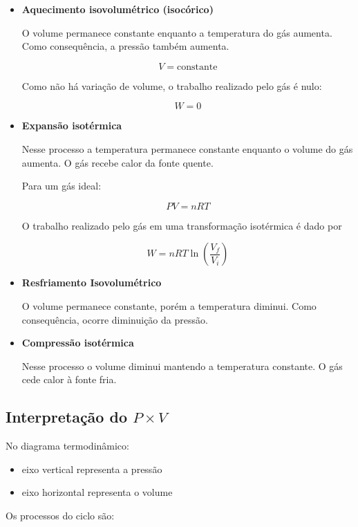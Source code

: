 \documentclass[a4paper,12pt]{article}
\begin{document}
\begin{itemize}

\item \colorbox{roxofigura!50}{\textbf{Aquecimento isovolumétrico (isocórico)}}

O volume permanece constante enquanto a temperatura do gás aumenta. Como consequência, a pressão também aumenta.

\[
V = \text{constante}
\]

Como não há variação de volume, o trabalho realizado pelo gás é nulo:

\[
W = 0
\]

\item \colorbox{blue!40}{\textbf{Expansão isotérmica}}

Nesse processo a temperatura permanece constante enquanto o volume do gás aumenta. O gás recebe calor da fonte quente.

Para um gás ideal:

\[
\boxed{
PV = nRT
}
\]

O trabalho realizado pelo gás em uma transformação isotérmica é dado por

\[
\boxed{
W = nRT \ln\left(\frac{V_f}{V_i}\right)
}
\]

\item \colorbox{red!40}{\textbf{Resfriamento Isovolumétrico}}

O volume permanece constante, porém a temperatura diminui. Como consequência, ocorre diminuição da pressão.

\item \colorbox{azulclaro!35}{\textbf{Compressão isotérmica}}

Nesse processo o volume diminui mantendo a temperatura constante. O gás cede calor à fonte fria.

\end{itemize}

\subsection*{Interpretação do $P \times V$}

No diagrama termodinâmico:

\begin{itemize}
\item eixo vertical representa a pressão
\item eixo horizontal representa o volume
\end{itemize}

Os processos do ciclo são:
\end{document}
